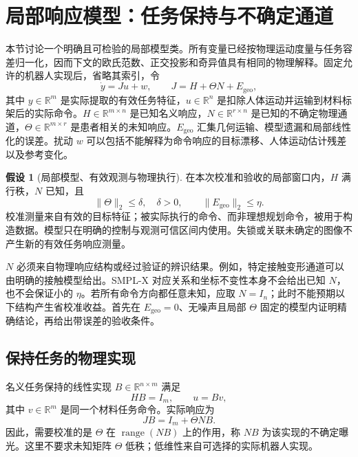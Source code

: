 \documentclass[11pt,a4paper]{article}
\numberwithin{equation}{section}
\theoremstyle{definition}
\newtheorem{assumption}[theorem]{假设}
\begin{document}
\section{局部响应模型：任务保持与不确定通道}
\label{sec:cal-local}

本节讨论一个明确且可检验的局部模型类。所有变量已经按物理运动度量与任务容差归一化，因而下文的欧氏范数、正交投影和奇异值具有相同的物理解释。固定允许的机器人实现后，省略其索引，令
\begin{equation}
  \dot y=Ju+w,\qquad
  J=H+\Theta N+E_{\mathrm{geo}},
  \label{eq:cal-model}
\end{equation}
其中 $y\in\mathbb R^m$ 是实际提取的有效任务特征，$u\in\mathbb R^n$ 是扣除人体运动并运输到材料标架后的实际命令。$H\in\mathbb R^{m\times n}$ 是已知名义响应，$N\in\mathbb R^{r\times n}$ 是已知的不确定物理通道，$\Theta\in\mathbb R^{m\times r}$ 是患者相关的未知响应。$E_{\mathrm{geo}}$ 汇集几何运输、模型遗漏和局部线性化的误差。扰动 $w$ 可以包括不能解释为命令响应的目标漂移、人体运动估计残差以及参考变化。

\begin{assumption}[局部模型、有效观测与物理执行]
\label{ass:cal-model}
在本次校准和验收的局部窗口内，$H$ 满行秩，$N$ 已知，且
\begin{equation}
  \|\Theta\|_2\le\delta,\quad\delta>0,\qquad
  \|E_{\mathrm{geo}}\|_2\le\eta .
\end{equation}
校准测量来自有效的目标特征；被实际执行的命令、而非理想规划命令，被用于构造数据。模型只在明确的控制与观测可信区间内使用。失锁或关联未确定的图像不产生新的有效任务响应测量。
\end{assumption}

$N$ 必须来自物理响应结构或经过验证的辨识结果。例如，特定接触变形通道可以由明确的接触模型给出。SMPL-X 对应关系和坐标不变性本身不会给出已知 $N$，也不会保证小的 $\eta$。若所有命令方向都任意未知，应取 $N=I_n$；此时不能预期以下结构产生省校准收益。首先在 $E_{\mathrm{geo}}=0$、无噪声且局部 $\Theta$ 固定的模型内证明精确结论，再给出带误差的验收条件。

\subsection{保持任务的物理实现}

名义任务保持的线性实现 $B\in\mathbb R^{n\times m}$ 满足
\begin{equation}
  HB=I_m,\qquad u=Bv ,
  \label{eq:cal-lift}
\end{equation}
其中 $v\in\mathbb R^m$ 是同一个材料任务命令。实际响应为
\begin{equation}
  JB=I_m+\Theta NB .
  \label{eq:cal-exposure}
\end{equation}
因此，需要校准的是 $\Theta$ 在 $\operatorname{range}(NB)$ 上的作用，称 $NB$ 为该实现的不确定曝光。这里不要求未知矩阵 $\Theta$ 低秩；低维性来自可选择的实际机器人实现。
\end{document}
